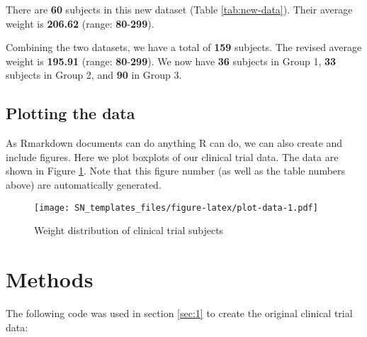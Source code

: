 \documentclass[smallextended]{svjour3}       %
\begin{document}
There are \textbf{60} subjects in this new dataset (Table \ref{tab:new-data}). Their average weight is \textbf{206.62} (range: \textbf{80}-\textbf{299}).

Combining the two datasets, we have a total of \textbf{159} subjects. The revised average weight is \textbf{195.91} (range: \textbf{80}-\textbf{299}). We now have \textbf{36} subjects in Group 1, \textbf{33} subjects in Group 2, and \textbf{90} in Group 3.

\hypertarget{sec:2}{%
\subsection{Plotting the data}\label{sec:2}}

As Rmarkdown documents can do anything R can do, we can also create and include figures. Here we plot boxplots of our clinical trial data. The data are shown in Figure \ref{fig:plot-data}. Note that this figure number (as well as the table numbers above) are automatically generated.

\begin{figure}
\centering
\texttt{[image: SN\_templates\_files/figure-latex/plot-data-1.pdf]}
\caption{\label{fig:plot-data}Weight distribution of clinical trial subjects}
\end{figure}

\hypertarget{methods}{%
\section{Methods}\label{methods}}

The following code was used in section \ref{sec:1} to create the original clinical trial data:
\end{document}
